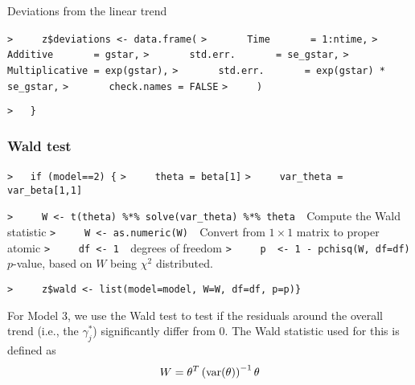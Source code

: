 \documentclass[a4paper]{article}
\begin{document}
Deviations from the linear trend\par
\verb~>     z$deviations <- data.frame(~\newline
\verb~>       Time       = 1:ntime,~\newline
\verb~>       Additive       = gstar,~\newline
\verb~>       std.err.       = se_gstar,~\newline
\verb~>       Multiplicative = exp(gstar),~\newline
\verb~>       std.err.       = exp(gstar) * se_gstar,~\newline
\verb~>       check.names = FALSE~\newline
\verb~>     )~\par

\verb~>   }~\par


\subsubsection{Wald test}\par

\verb~>   if (model==2) {~\newline
\verb~>     theta = beta[1]~\newline
\verb~>     var_theta = var_beta[1,1]~\par

\verb~>     W <- t(theta) %*% solve(var_theta) %*% theta  ~{\sffamily Compute the Wald statistic}\newline
\verb~>     W <- as.numeric(W)  ~{\sffamily Convert from $1\times1$ matrix to proper atomic}\newline
\verb~>     df <- 1  ~{\sffamily degrees of freedom}\newline
\verb~>     p  <- 1 - pchisq(W, df=df)  ~{\sffamily $p$-value, based on $W$ being $\chi^2$ distributed.}\par

\verb~>     z$wald <- list(model=model, W=W, df=df, p=p)}~\par

For Model 3, we use the Wald test to test if the residuals around the overall
trend (i.e., the $\gamma_j^\ast$) significantly differ from 0.
The Wald statistic used for this is defined as
\begin{equation}
  W = \theta^T \left(\operatorname{var}(\theta)\right)^{-1} \theta
\end{equation}\par
\end{document}

